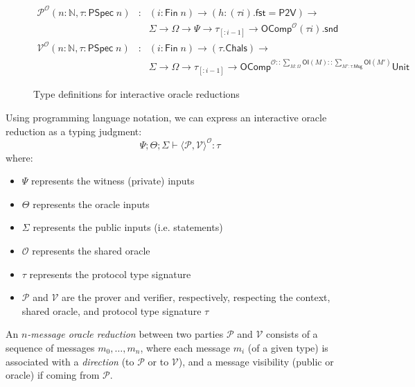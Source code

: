 \begin{figure}[t]
\[\begin{array}{rcl}
        \mathcal{P}^{\mathcal{O}}(n : \mathbb{N}, \tau : \mathsf{PSpec}\; n) &:& (i : \mathsf{Fin}\; n) \to (h : (\tau i).\mathsf{fst} = \mathsf{P2V}) \to \\
        && \varSigma \to \Omega \to \Psi \to \tau_{[:i - 1]} \to \mathsf{OComp}^{\mathcal{O}} (\tau i).\mathsf{snd} \\[1em]
        \mathcal{V}^{\mathcal{O}}(n : \mathbb{N}, \tau : \mathsf{PSpec}\; n) &:& (i : \mathsf{Fin}\; n) \to (\tau.\mathsf{Chals}) \to \\
        && \varSigma \to \Omega \to \tau_{[:i - 1]} \to \mathsf{OComp}^{\mathcal{O} :: \sum_{M : \Omega} \mathsf{OI}(M) :: \sum_{M' : \tau.\mathsf{Msg}} \mathsf{OI}(M')} \mathsf{Unit}
    \end{array}\]
    \caption{Type definitions for interactive oracle reductions}
    \label{fig:type-defs}
\end{figure}

Using programming language notation, we can express an interactive oracle reduction as a typing judgment:
\[
    \Psi; \Theta; \varSigma \vdash \langle\mathcal{P}, \mathcal{V}\rangle^{\mathcal{O}} : \tau
\]
where:
\begin{itemize}
    \item $\Psi$ represents the witness (private) inputs
    \item $\Theta$ represents the oracle inputs
    \item $\varSigma$ represents the public inputs (i.e. statements)
    \item $\mathcal{O}$ represents the shared oracle
    \item $\tau$ represents the protocol type signature
    \item $\mathcal{P}$ and $\mathcal{V}$ are the prover and verifier, respectively, respecting the context, shared oracle, and protocol type signature $\tau$
\end{itemize}

\begin{definition}
    \label{def:oracle_reduction_type_signature}
    An \emph{$n$-message oracle reduction} between two parties $\mathcal{P}$ and $\mathcal{V}$
    consists of a sequence of messages $m_0, \dots, m_n$, where each message $m_i$ (of a given
    type) is associated with a \emph{direction} (to $\mathcal{P}$ or to $\mathcal{V}$), and a
    message visibility (public or oracle) if coming from $\mathcal{P}$.
    

\end{definition}

